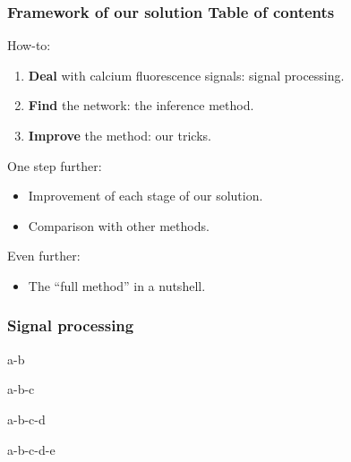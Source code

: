 \documentclass[final]{beamer}
\begin{document}
\begin{frame}

\frametitle{Framework of our solution  \hspace{15pt} {\small Table of contents} }

{\color{red} How-to}:
\begin{enumerate}
\item \textbf{Deal} with calcium fluorescence signals: {\color{i6blue} signal processing}.
\item \textbf{Find} the network: the {\color{i6blue} {inference} method}.
\item \textbf{Improve} the method: our {\color{i6blue} {tricks}}.
\end{enumerate}\vskip5pt

{\color{red} One step further}:
\begin{itemize}
\item Improvement of each stage of our solution.
\item Comparison with other methods.
\end{itemize}\vskip5pt

{\color{red} Even further}: 
\begin{itemize}
\item The ``full method'' in a nutshell.
\end{itemize}

\end{frame}


\begin{frame}

\frametitle{Signal processing}

\begin{overprint}
a-b

a-b-c

a-b-c-d

a-b-c-d-e
\end{overprint}

\end{frame}

\end{document}
